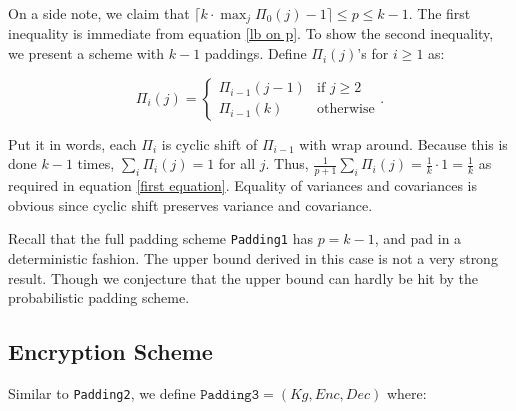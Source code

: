 On a side note, we claim that $\lceil k \cdot \max_{j}{\Pi_0(j)} - 1 \rceil \leq p \leq k - 1$. The first inequality is immediate from equation \ref{lb on p}. To show the second inequality, we present a scheme with $k-1$ paddings. Define $\Pi_i(j)$'s for $i \geq 1$ as:

\begin{equation*}
	\Pi_i(j) = \begin{cases}
		\Pi_{i-1}(j-1) & \text{if } j \geq 2 \\
		\Pi_{i-1}(k)   & \text{otherwise}
	\end{cases}.
\end{equation*}

Put it in words, each $\Pi_i$ is cyclic shift of $\Pi_{i-1}$ with wrap around. Because this is done $k-1$ times, $\sum_{i}\Pi_i(j) = 1$ for all $j$. Thus, $\frac{1}{p+1} \sum_{i}\Pi_i(j) = \frac{1}{k} \cdot 1 = \frac{1}{k}$ as required in equation \ref{first equation}. Equality of variances and covariances is obvious since cyclic shift preserves variance and covariance.

Recall that the full padding scheme \texttt{Padding1} has $p = k -1$, and pad in a deterministic fashion. The upper bound derived in this case is not a very strong result. Though we conjecture that the upper bound can hardly be hit by the probabilistic padding scheme.


\subsection{Encryption Scheme}
Similar to \texttt{Padding2}, we define $\texttt{Padding3} = (Kg, Enc, Dec)$ where:

